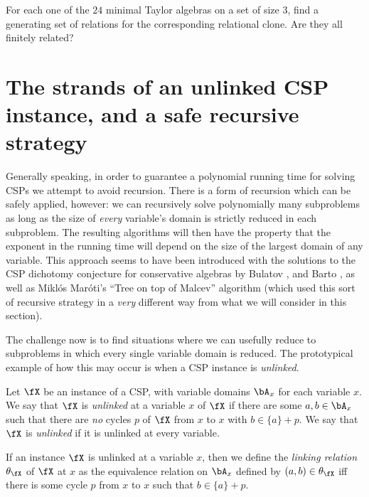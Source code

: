 \begin{prob} For each one of the $24$ minimal Taylor algebras on a set of size $3$, find a generating set of relations for the corresponding relational clone. Are they all finitely related?
\end{prob}


\section{The strands of an unlinked CSP instance, and a safe recursive strategy}

Generally speaking, in order to guarantee a polynomial running time for solving CSPs we attempt to avoid recursion. There is a form of recursion which can be safely applied, however: we can recursively solve polynomially many subproblems as long as the size of \emph{every} variable's domain is strictly reduced in each subproblem. The resulting algorithms will then have the property that the exponent in the running time will depend on the size of the largest domain of any variable. This approach seems to have been introduced with the solutions to the CSP dichotomy conjecture for conservative algebras by Bulatov \cite{bulatov-conservative}, \cite{bulatov-conservative-rerevisited} and Barto \cite{barto-conservative-revisited}, as well as Mikl\'os Mar\'oti's ``Tree on top of Malcev'' algorithm \cite{tree-on-top-of-malcev} (which used this sort of recursive strategy in a \emph{very} different way from what we will consider in this section).

The challenge now is to find situations where we can usefully reduce to subproblems in which every single variable domain is reduced. The prototypical example of how this may occur is when a CSP instance is \emph{unlinked}.

\begin{defn} Let $\fX$ be an instance of a CSP, with variable domains $\bA_x$ for each variable $x$. We say that $\fX$ is \emph{unlinked} at a variable $x$ of $\fX$ if there are some $a,b \in \bA_x$ such that there are \emph{no} cycles $p$ of $\fX$ from $x$ to $x$ with $b \in \{a\} + p$. We say that $\fX$ is \emph{unlinked} if it is unlinked at every variable.

If an instance $\fX$ is unlinked at a variable $x$, then we define the \emph{linking relation} $\theta_\fX$ of $\fX$ at $x$ as the equivalence relation on $\bA_x$ defined by $(a,b) \in \theta_\fX$ iff there is some cycle $p$ from $x$ to $x$ such that $b \in \{a\} + p$.
\end{defn}

